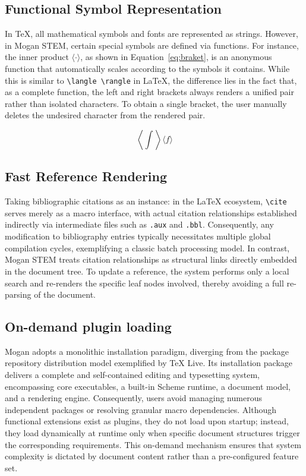 \subsection{Functional Symbol Representation}

In \TeX{}, all mathematical symbols and fonts are represented as strings. However, in Mogan STEM, certain special symbols are defined via functions. For instance, the inner product $\langle \cdot \rangle$, as shown in Equation~\eqref{eq:braket}, is an anonymous function that automatically scales according to the symbols it contains. While this is similar to \verb|\langle \rangle| in \LaTeX{}, the difference lies in the fact that, as a complete function, the left and right brackets always renders a unified pair rather than isolated characters. To obtain a single bracket, the user manually deletes the undesired character from the rendered pair.

\begin{equation}
    \label{eq:braket}
    \left\langle \int \right\rangle \langle f \rangle
\end{equation}

\subsection{Fast Reference Rendering}

Taking bibliographic citations as an instance: in the \LaTeX{} ecosystem, \verb|\cite| serves merely as a macro interface, with actual citation relationships established indirectly via intermediate files such as \verb|.aux| and \verb|.bbl|. Consequently, any modification to bibliography entries typically necessitates multiple global compilation cycles, exemplifying a classic batch processing model. In contrast, Mogan STEM treats citation relationships as structural links directly embedded in the document tree. To update a reference, the system performs only a local search and re-renders the specific leaf nodes involved, thereby avoiding a full re-parsing of the document.

\subsection{On-demand plugin loading}

Mogan adopts a monolithic installation paradigm, diverging from the package repository distribution model exemplified by TeX Live. Its installation package delivers a complete and self-contained editing and typesetting system, encompassing core executables, a built-in Scheme runtime, a document model, and a rendering engine. Consequently, users avoid managing numerous independent packages or resolving granular macro dependencies. Although functional extensions exist as plugins, they do not load upon startup; instead, they load dynamically at runtime only when specific document structures trigger the corresponding requirements. This on-demand mechanism ensures that system complexity is dictated by document content rather than a pre-configured feature set.


